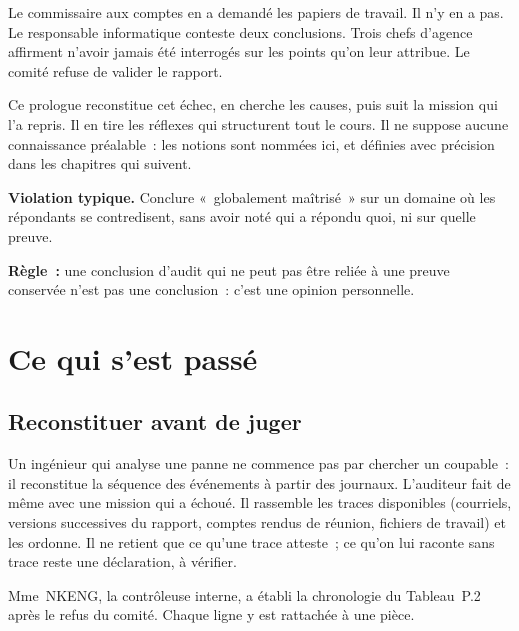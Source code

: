 Le commissaire aux comptes en a demandé les papiers de travail. Il n'y en a
pas. Le responsable informatique conteste deux conclusions. Trois chefs
d'agence affirment n'avoir jamais été interrogés sur les points qu'on leur
attribue. Le comité refuse de valider le rapport.

\medskip

Ce prologue reconstitue cet échec, en cherche les causes, puis suit la
mission qui l'a repris. Il en tire les réflexes qui structurent tout le
cours. Il ne suppose aucune connaissance préalable~: les notions sont
nommées ici, et définies avec précision dans les chapitres qui suivent.

\begin{boxalert}
\textbf{Violation typique.} Conclure «~globalement maîtrisé~» sur un domaine
où les répondants se contredisent, sans avoir noté qui a répondu quoi, ni
sur quelle preuve.

\smallskip
\textbf{Règle~:} une conclusion d'audit qui ne peut pas être reliée à une
preuve conservée n'est pas une conclusion~: c'est une opinion personnelle.
\end{boxalert}

\separateur

\section{Ce qui s'est passé}
\label{sec:pro-chronologie}

\subsection{Reconstituer avant de juger}

Un ingénieur qui analyse une panne ne commence pas par chercher un
coupable~: il reconstitue la séquence des événements à partir des journaux.
L'auditeur fait de même avec une mission qui a échoué. Il rassemble les
traces disponibles (courriels, versions successives du rapport, comptes
rendus de réunion, fichiers de travail) et les ordonne. Il ne retient que ce
qu'une trace atteste~; ce qu'on lui raconte sans trace reste une
déclaration, à vérifier.

Mme~NKENG, la contrôleuse interne, a établi la chronologie du
Tableau~P.2 après le refus du comité. Chaque ligne y est rattachée à une
pièce.

